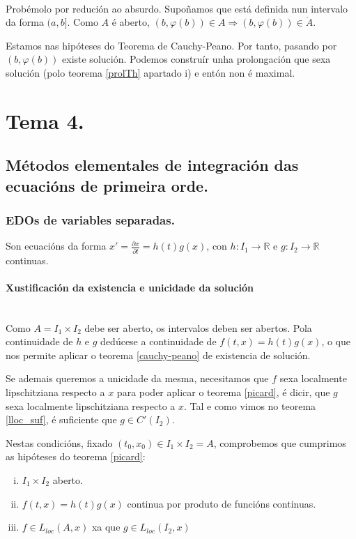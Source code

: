\documentclass[11pt, a4paper,twoside]{article}
\makeatletter
\theoremstyle{theorem-style}  %
\renewenvironment{proof}[1][\proofname]{\par
	\pushQED{\qed}%
	\normalfont \topsep6\p@\@plus6\p@\relax
	\list{}{%
		\settowidth{\leftmargin}{\quad:\hskip\labelsep}%
		\setlength{\labelwidth}{0pt}%
		\setlength{\itemindent}{-\leftmargin}%
	}%
	\item[\hskip\labelsep\itshape#1\@addpunct{:}]\ignorespaces
}{%
	\popQED\endlist\@endpefalse
}
\theoremstyle{definition-style}
\theoremstyle{example-style}
\let\oldsection\section
\def\section{\cleardoublepage\oldsection}
\makeatother
\begin{document}
\begin{proof}\ \\
	Probémolo por redución ao absurdo. Supoñamos que está definida nun intervalo da forma $ (a,b] $.
	Como $ A $ é aberto, $ (b,\varphi(b))\in A \Rightarrow (b, \varphi(b)) \in \mathring{A} $.
	
	Estamos nas hipóteses do Teorema de Cauchy-Peano. Por tanto, pasando por $ (b, \varphi(b)) $ existe solución. Podemos construír unha prolongación que sexa solución (polo teorema \ref{prolTh} apartado i) e entón non é maximal.
\end{proof}


\section{Tema 4.}
\subsection{Métodos elementales de integración das ecuacións de primeira orde.}
\subsubsection{EDOs de variables separadas.}
Son ecuacións da forma $ x'=\frac{\partial x}{\partial t}=h(t)g(x) $, con $ h:I_1\longrightarrow\mathbb{R} $ e $ g:I_2\longrightarrow\mathbb{R} $ continuas. 
\paragraph{Xustificación da existencia e unicidade da solución} \ \\
Como $ A=I_1\times I_2 $ debe ser aberto, os intervalos deben ser abertos. Pola continuidade de $ h $ e $ g $ dedúcese a continuidade de $ f(t,x)=h(t)g(x) $, o que nos permite aplicar o teorema \ref{cauchy-peano} de existencia de solución.

Se ademais queremos a unicidade da mesma, necesitamos que $ f $ sexa localmente lipschitziana respecto a $ x $ para poder aplicar o teorema \ref{picard}, é dicir, que $ g $ sexa localmente lipschitziana respecto a $ x $. Tal e como vimos no teorema \ref{lloc_suf}, é suficiente que $ g\in C'(I_2) $.

Nestas condicións, fixado $ (t_0,x_0)\in I_1\times I_2=A $, comprobemos que cumprimos as hipóteses do teorema \ref{picard}:
\begin{enumerate}[i)]
	\item $ I_1\times I_2 $ aberto.
	\item $ f(t,x)=h(t)g(x) $ continua por produto de funcións continuas.
	\item $ f\in L_{loc} (A,x) $ xa que $ g\in L_{loc}(I_2,x) $
\end{enumerate}
\end{document}
